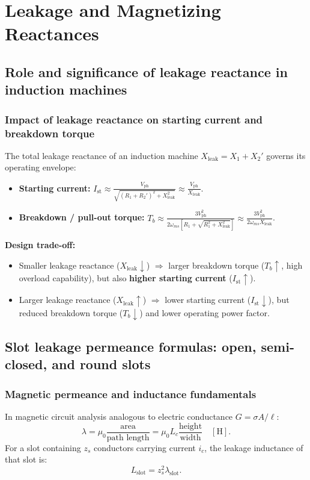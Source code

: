 \section{Leakage and Magnetizing Reactances}

\subsection{Role and significance of leakage reactance in induction machines}

\subsubsection{Impact of leakage reactance on starting current and breakdown torque}
The total leakage reactance of an induction machine \(X_{\mathrm{leak}} = X_1 + X_2'\) governs its operating envelope:
\begin{itemize}
  \item \textbf{Starting current:} \(I_{\mathrm{st}} \approx \frac{V_{\mathrm{ph}}}{\sqrt{(R_1 + R_2')^2 + X_{\mathrm{leak}}^2}} \approx \frac{V_{\mathrm{ph}}}{X_{\mathrm{leak}}}\).
  \item \textbf{Breakdown / pull-out torque:} \(T_b \approx \frac{3 V_{\mathrm{ph}}^2}{2\omega_{ms}\left[ R_1 + \sqrt{R_1^2 + X_{\mathrm{leak}}^2} \right]} \approx \frac{3 V_{\mathrm{ph}}^2}{2\omega_{ms} X_{\mathrm{leak}}}\).
\end{itemize}
\textbf{Design trade-off:}
\begin{itemize}
  \item Smaller leakage reactance (\(X_{\mathrm{leak}}\downarrow\)) \(\Rightarrow\) larger breakdown torque (\(T_b\uparrow\), high overload capability), but also \textbf{higher starting current} (\(I_{\mathrm{st}}\uparrow\)).
  \item Larger leakage reactance (\(X_{\mathrm{leak}}\uparrow\)) \(\Rightarrow\) lower starting current (\(I_{\mathrm{st}}\downarrow\)), but reduced breakdown torque (\(T_b\downarrow\)) and lower operating power factor.
\end{itemize}

\subsection{Slot leakage permeance formulas: open, semi-closed, and round slots}

\subsubsection{Magnetic permeance and inductance fundamentals}
In magnetic circuit analysis analogous to electric conductance \(G = \sigma A / \ell\):
\[
\lambda = \mu_0 \frac{\text{area}}{\text{path length}} = \mu_0 L_c \frac{\text{height}}{\text{width}}\quad[\mathrm{H}].
\]
For a slot containing \(z_s\) conductors carrying current \(i_c\), the leakage inductance of that slot is:
\[
L_{\mathrm{slot}} = z_s^2 \lambda_{\mathrm{slot}}.
\]

